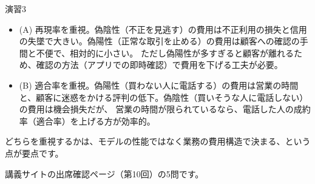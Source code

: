 \begin{answer}{演習3}
\begin{itemize}
  \item (A) 再現率を重視。偽陰性（不正を見逃す）の費用は不正利用の損失と信用の失墜で大きい。偽陽性（正常な取引を止める）の費用は顧客への確認の手間と不便で、相対的に小さい。
        ただし偽陽性が多すぎると顧客が離れるため、確認の方法（アプリでの即時確認）で費用を下げる工夫が必要。
  \item (B) 適合率を重視。偽陽性（買わない人に電話する）の費用は営業の時間と、顧客に迷惑をかける評判の低下。偽陰性（買いそうな人に電話しない）の費用は機会損失だが、
        営業の時間が限られているなら、電話した人の成約率（適合率）を上げる方が効率的。
\end{itemize}
どちらを重視するかは、モデルの性能ではなく業務の費用構造で決まる、という点が要点です。
\end{answer}

講義サイトの出席確認ページ（第10回）の5問です。

